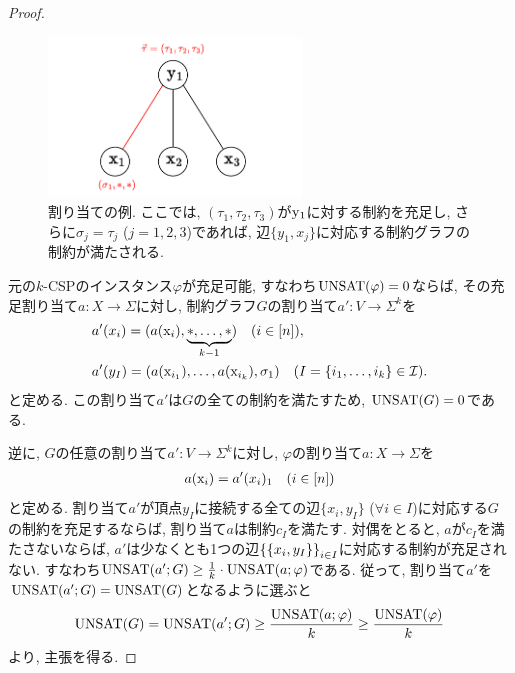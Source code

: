 \begin{proof}
  \begin{figure}[ht]
    \centering
    \includegraphics[width=0.6\textwidth]{images/k-to-two2.pdf}
    \caption{割り当ての例. ここでは, $(\tau_1,\tau_2,\tau_3)$が$\mathrm{y}_1$に対する制約を充足し, さらに$\sigma_j=\tau_j$ ($j=1,2,3$)であれば, 辺$\{y_1,x_j\}$に対応する制約グラフの制約が満たされる. \label{fig:k-to-two2}}
  \end{figure}

  元の$k$-CSPのインスタンス$\varphi$が充足可能, すなわち$\mathrm{UNSAT}(\varphi)=0$ならば, その充足割り当て$a\colon X \to \Sigma$に対し, 
  制約グラフ$G$の割り当て$a'\colon V\to \Sigma^k$を
  \begin{align*}
    & a'(x_i) = (a(\mathrm{x}_i),\underbrace{\ast,\dots,\ast}_{k-1}) \quad (i\in[n]), \\
    & a'(y_I) = \qty(a(\mathrm{x}_{i_1}),\dots,a(\mathrm{x}_{i_k}),\sigma_1) \quad (I=\qty{i_1,\dots,i_k}\in\mathcal{I}).
  \end{align*}
  と定める. この割り当て$a'$は$G$の全ての制約を満たすため, $\mathrm{UNSAT}(G)=0$である.

  逆に, $G$の任意の割り当て$a'\colon V\to \Sigma^k$に対し, $\varphi$の割り当て$a\colon X\to \Sigma$を
  \begin{align*}
    a(\mathrm{x}_i) = a'(x_i)_1 \quad (i\in[n])
  \end{align*}
  と定める.
  割り当て$a'$が頂点$y_I$に接続する全ての辺$\{x_i,y_I\}$ ($\forall i\in I$)に対応する$G$の制約を充足するならば,
  割り当て$a$は制約$c_I$を満たす.
  対偶をとると, $a$が$c_I$を満たさないならば, $a'$は少なくとも1つの辺$\qty{\{x_i,y_I\}}_{i\in I}$に対応する制約が充足されない.
  すなわち$\mathrm{UNSAT}(a';G) \ge \frac{1}{k}\cdot \mathrm{UNSAT}(a;\varphi)$である.
  従って, 割り当て$a'$を$\mathrm{UNSAT}(a';G)=\mathrm{UNSAT}(G)$となるように選ぶと
  \begin{align*}
    \mathrm{UNSAT}(G) = \mathrm{UNSAT}(a';G) \ge \frac{\mathrm{UNSAT}(a;\varphi)}{k}  \ge \frac{\mathrm{UNSAT}(\varphi)}{k}
  \end{align*}
  より, 主張を得る.
  
\end{proof}


